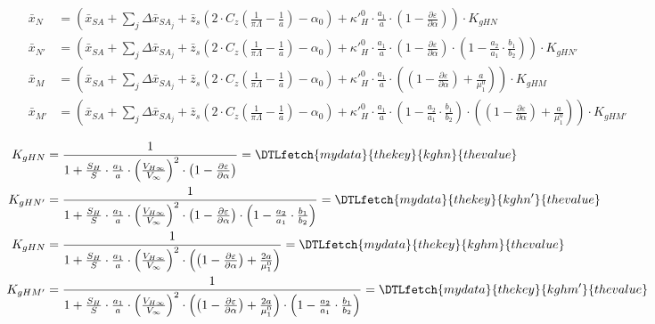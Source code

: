 \documentclass{sprawozdanie}
\newcommand{\PlaneVar}[1]{\DTLfetch{mydata}{thekey}{#1}{thevalue}}
\begin{document}
\begin{align}
    \bar x_N &= \left(\bar x_{SA} + \sum_j \Delta \bar x_{SA_j} + \bar z_s \left(2 \cdot C_z \left(\frac{1}{\pi \Lambda} - \frac{1}{a}\right) - \alpha_0\right) + \kappa'^0_H \cdot\frac{a_1}{a}\cdot\left(1 - \frac{\partial \varepsilon}{\partial \alpha}\right)\right) \cdot K_{gHN} \label{eq:xN}\\
    \bar x_{N'} &= \left(\bar x_{SA} + \sum_j \Delta \bar x_{SA_j} + \bar z_s \left(2 \cdot C_z \left(\frac{1}{\pi \Lambda} - \frac{1}{a}\right) - \alpha_0\right) + \kappa'^0_H \cdot\frac{a_1}{a}\cdot\left(1 - \frac{\partial \varepsilon}{\partial \alpha}\right)\cdot\left(1 - \frac{a_2}{a_1}\cdot\frac{b_1}{b_2}\right)\right) \cdot K_{gHN'} \label{eq:xNprim}\\
    \bar x_M &= \left(\bar x_{SA} + \sum_j \Delta \bar x_{SA_j} + \bar z_s \left(2 \cdot C_z \left(\frac{1}{\pi \Lambda} - \frac{1}{a}\right) - \alpha_0\right) + \kappa'^0_H \cdot\frac{a_1}{a}\cdot\left(\left(1 - \frac{\partial \varepsilon}{\partial \alpha}\right) + \frac{a}{\mu_1^0}\right)\right) \cdot K_{gHM} \label{eq:xM}\\
    \bar x_{M'} &= \left(\bar x_{SA} + \sum_j \Delta \bar x_{SA_j} + \bar z_s \left(2 \cdot C_z \left(\frac{1}{\pi \Lambda} - \frac{1}{a}\right) - \alpha_0\right) + \kappa'^0_H \cdot\frac{a_1}{a}\cdot\left(1 - \frac{a_2}{a_1}\cdot\frac{b_1}{b_2}\right)\cdot\left(\left(1 - \frac{\partial \varepsilon}{\partial \alpha}\right) + \frac{a}{\mu_1^0}\right)\right) \cdot K_{gHM'} \label{eq:xMprim}
\end{align}




\begin{align}
    K_{gHN} &= \frac{1}{1+\frac{S_H}{S}\cdot\frac{a_1}{a}\cdot\left(\frac{V_{H\infty}}{V_\infty}\right)^2 \cdot \left(1 - \frac{\partial\varepsilon}{\partial\alpha}\right)} = \PlaneVar{kghn} \label{eq:KgHN}\\
    K_{gHN'} &= \frac{1}{1+\frac{S_H}{S}\cdot\frac{a_1}{a}\cdot\left(\frac{V_{H\infty}}{V_\infty}\right)^2 \cdot \left(1 - \frac{\partial\varepsilon}{\partial\alpha}\right)\cdot\left(1 - \frac{a_2}{a_1}\cdot\frac{b_1}{b_2}\right)} = \PlaneVar{kghn'} \label{eq:KgHNprim}\\
    K_{gHN} &= \frac{1}{1+\frac{S_H}{S}\cdot\frac{a_1}{a}\cdot\left(\frac{V_{H\infty}}{V_\infty}\right)^2 \cdot \left(\left(1 - \frac{\partial\varepsilon}{\partial\alpha}\right) + \frac{2 a}{\mu^0_1}\right)}\label{eq:KgHM} = \PlaneVar{kghm}\\
    K_{gHM'} &= \frac{1}{1+\frac{S_H}{S}\cdot\frac{a_1}{a}\cdot\left(\frac{V_{H\infty}}{V_\infty}\right)^2 \cdot \left(\left(1 - \frac{\partial\varepsilon}{\partial\alpha}\right) + \frac{2 a}{\mu_1^0}\right)\cdot\left(1 - \frac{a_2}{a_1}\cdot\frac{b_1}{b_2}\right)} = \PlaneVar{kghm'} \label{eq:KgHMprim}
\end{align}
\end{document}
